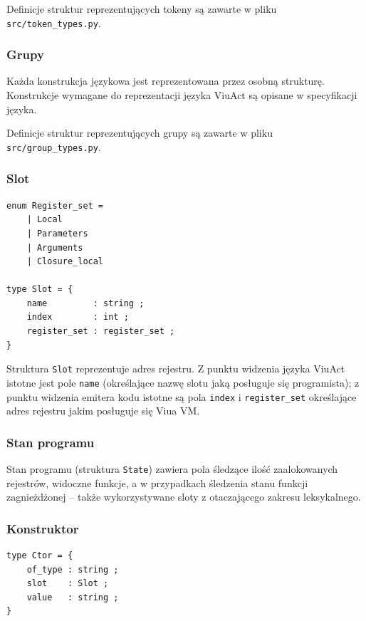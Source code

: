 \documentclass[11pt,oneside,a4paper,titlepage,onecolumn]{article}
\begin{document}
Definicje struktur reprezentujących tokeny są zawarte w pliku \texttt{src/token\_types.py}.

\subsubsection{Grupy}
\label{diagram_klas_grupy}

Każda konstrukcja językowa jest reprezentowana przez osobną strukturę. Konstrukcje wymagane do reprezentacji
języka ViuAct są opisane w specyfikacji języka.

Definicje struktur reprezentujących grupy są zawarte w pliku \texttt{src/group\_types.py}.

\subsubsection{Slot}
\label{diagram_klas_slot}

\begin{lstlisting}
enum Register_set =
    | Local
    | Parameters
    | Arguments
    | Closure_local

type Slot = {
    name         : string ;
    index        : int ;
    register_set : register_set ;
}
\end{lstlisting}

Struktura \texttt{Slot} reprezentuje adres rejestru. Z punktu widzenia języka ViuAct istotne jest pole
\texttt{name} (określające nazwę slotu jaką posługuje się programista); z punktu widzenia emitera kodu istotne
są pola \texttt{index} i \texttt{register\_set} określające adres rejestru jakim posługuje się Viua VM.

\subsubsection{Stan programu}
\label{diagram_klas_stan_programu}

Stan programu (struktura \texttt{State}) zawiera pola śledzące ilość zaalokowanych rejestrów, widoczne
funkcje, a w przypadkach śledzenia stanu funkcji zagnieżdżonej -- także wykorzystywane sloty z otaczającego
zakresu leksykalnego.

\subsubsection{Konstruktor}
\label{diagram_klas_konstruktor}

\begin{lstlisting}
type Ctor = {
    of_type : string ;
    slot    : Slot ;
    value   : string ;
}
\end{lstlisting}
\end{document}
